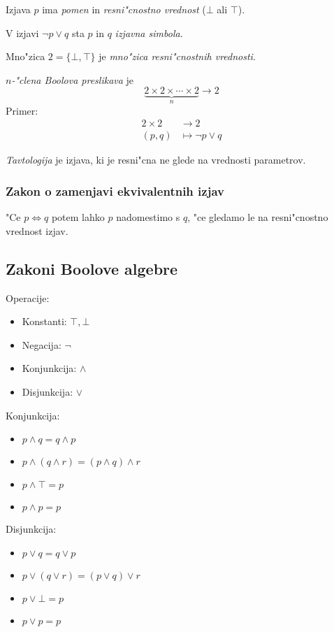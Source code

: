 Izjava $p$ ima \emph{pomen} in \emph{resni"cnostno vrednost} ($\bot$ ali $\top$).

V izjavi $\lnot p \lor q$ sta $p$ in $q$ \emph{izjavna simbola}.

Mno"zica $2 = \{\bot, \top\}$ je \emph{mno"zica resni"cnostnih vrednosti}.

\emph{$n$-"clena Boolova preslikava} je
\begin{equation*}
\underbrace{2\times 2 \times \cdots \times 2}_{n} \rightarrow 2
\end{equation*}
Primer:
\begin{align*}
2\times 2 &\rightarrow 2\\
(p, q) &\mapsto \lnot p \lor q
\end{align*}

\emph{Tavtologija} je izjava, ki je resni"cna ne glede na vrednosti parametrov.

\subsubsection*{Zakon o zamenjavi ekvivalentnih izjav}
"Ce $p \iff q$ potem lahko $p$ nadomestimo s $q$, "ce gledamo le na resni"cnostno vrednost izjav.

\subsection{Zakoni Boolove algebre}
Operacije:
\begin{itemize}
	\item Konstanti: $\top, \bot$
	\item Negacija: $\lnot$
	\item Konjunkcija: $\land$
	\item Disjunkcija: $\lor$
\end{itemize}

Konjunkcija:
\begin{itemize}
	\item $p \land q = q \land p$
	\item $p \land (q \land r) = (p \land q) \land r$
	\item $p \land \top = p$
	\item $p \land p = p$
\end{itemize}

Disjunkcija:
\begin{itemize}
	\item $p \lor q = q \lor p$
	\item $p \lor (q \lor r) = (p \lor q) \lor r$
	\item $p \lor \bot = p$
	\item $p \lor p = p$
\end{itemize}

